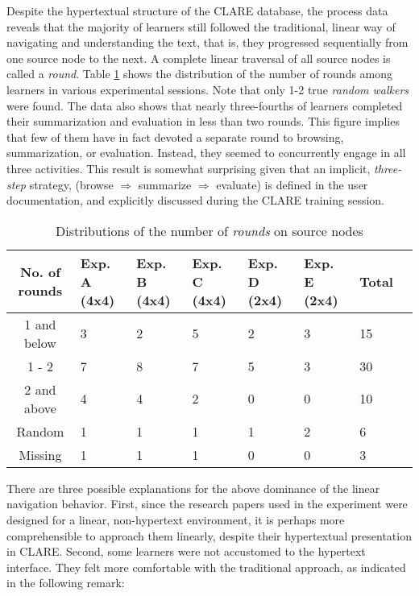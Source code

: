 Despite the hypertextual structure of the CLARE database, the process data
reveals that the majority of learners still followed the traditional,
linear way of navigating and understanding the text, that is, they
progressed sequentially from one source node to the next.  A complete
linear traversal of all source nodes is called a {\it round\/}.  Table
\ref{tab:round} shows the distribution of the number of rounds among
learners in various experimental sessions. Note that only 1-2 true {\it
random walkers\/} were found. The data also shows that nearly three-fourths
of learners completed their summarization and evaluation in less than two
rounds. This figure implies that few of them have in fact devoted a
separate round to browsing, summarization, or evaluation. Instead, they
seemed to concurrently engage in all three activities. This result is
somewhat surprising given that an implicit, {\it three-step\/} strategy,
({\sf browse\/} \({\Rightarrow}\) {\sf summarize \/} \({\Rightarrow}\) {\sf
evaluate\/}) is defined in the user documentation, and explicitly discussed
during the CLARE training session.

\small
\begin{table}[hbtp]
  \caption{Distributions of the number of {\it rounds\/} on source nodes}
  \begin{center}
    \begin{tabular} {||c|p{0.4in}|p{0.4in}|p{0.4in}|p{0.4in}|p{0.4in}|p{0.4in}|p{0.4in}||} \hline   
      {\bf No. of rounds} & {\bf Exp. A (4x4)} & {\bf Exp. B (4x4)} &
      {\bf Exp. C (4x4)} & {\bf Exp. D (2x4)} & {\bf Exp. E (2x4)} & {\bf
      Total}\\ \hline \hline
      
      1 and below & 3 & 2 & 5 & 2 &  3 & 15 \\ \hline

      1 - 2 & 7 & 8 & 7 & 5 & 3  & 30 \\ \hline

      2 and above & 4 & 4 & 2 & 0 & 0  & 10 \\ \hline

      Random & 1 & 1 & 1 & 1 & 2  & 6 \\ \hline
     Missing & 1 & 1 & 1 & 0 & 0  & 3 \\ \hline
    \end{tabular}
    \end{center}    
    \label{tab:round}
\end{table}
\normalsize
{}

There are three possible explanations for the above dominance of the linear
navigation behavior. First, since the research papers used in the
experiment were designed for a linear, non-hypertext environment, it is
perhaps more comprehensible to approach them linearly, despite their
hypertextual presentation in CLARE.  Second, some learners were not
accustomed to the hypertext interface. They felt more comfortable with the
traditional approach, as indicated in the following remark:

